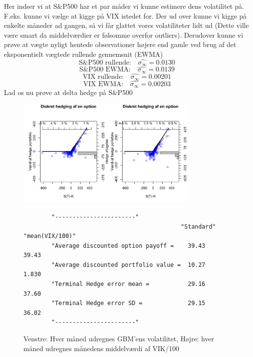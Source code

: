 \documentclass{article}
\theoremstyle{definition}
\theoremstyle{remark}
\begin{document}
Her indser vi at S\&P500 har et par måder vi kunne estimere dens volatilitet på. F.eks. kunne vi vælge at kigge på VIX istedet for. Der ud over kunne vi kigge på enkelte måneder ad gangen, så vi får glattet vores volatiliteter lidt ud (Dette ville være smart da middelværdier er følsomme overfor outliers). Derudover kunne vi prøve at vægte nyligt hentede observationer højere end gamle ved brug af det eksponentielt vægtede rullende gennemsnit (EWMA)
$$\text{S\&P500 rullende:}\quad\hat{\sigma_{\infty}}=0.0130$$
$$\text{S\&P500 EWMA:}\quad\hat{\sigma_{\infty}}=0.0139$$
$$\text{VIX rullende:}\quad\hat{\sigma_{\infty}}=0.00201$$
$$\text{VIX EWMA:}\quad\hat{\sigma_{\infty}}=0.00203$$
Lad os nu prøve at delta hedge på S\&P500
\begin{figure}
    \centering
    \includegraphics[width=3.5in]{Overleaf/option_call_monthlyGBM_meanVIX100}
    \caption{Venstre: Hver måned udregnes GBM'ens volatilitet, Højre: hver måned udregnes månedens middelværdi af VIK/100}
    \begin{verbatim}
        "-----------------------"                         
                                             "Standard"   "mean(VIX/100)"
        "Average discounted option payoff =    39.43          39.43
        "Average discounted portfolio value =  10.27          1.830
        "Terminal Hedge error mean =           29.16          37.60
        "Terminal Hedge error SD =             29.15          36.02
        "-----------------------"
    \end{verbatim}
    \label{fig:standard}
\end{figure}
\end{document}
